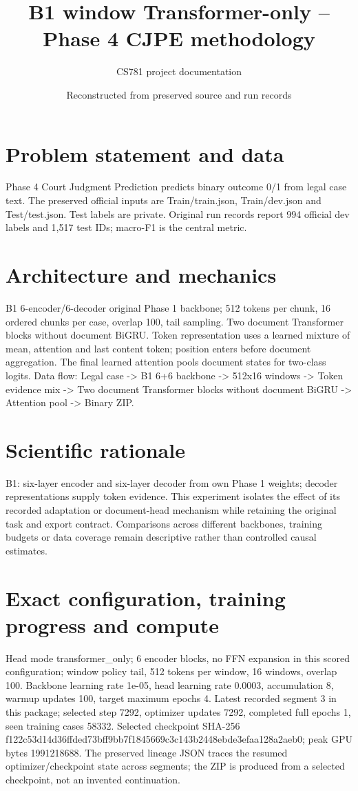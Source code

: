 \documentclass[11pt,a4paper]{article}
\begin{document}
\title{B1 window Transformer-only -- Phase 4 CJPE methodology}
\author{CS781 project documentation}
\date{Reconstructed from preserved source and run records}
\maketitle
\section{Problem statement and data}
Phase 4 Court Judgment Prediction predicts binary outcome 0/1 from legal case text. The preserved official inputs are Train/train.json, Train/dev.json and Test/test.json. Test labels are private. Original run records report 994 official dev labels and 1,517 test IDs; macro-F1 is the central metric.
\section{Architecture and mechanics}
B1 6-encoder/6-decoder original Phase 1 backbone; 512 tokens per chunk, 16 ordered chunks per case, overlap 100, tail sampling. Two document Transformer blocks without document BiGRU. Token representation uses a learned mixture of mean, attention and last content token; position enters before document aggregation. The final learned attention pools document states for two-class logits. Data flow: Legal case -> B1 6+6 backbone -> 512x16 windows -> Token evidence mix -> Two document Transformer blocks without document BiGRU -> Attention pool -> Binary ZIP.
\section{Scientific rationale}
B1: six-layer encoder and six-layer decoder from own Phase 1 weights; decoder representations supply token evidence. This experiment isolates the effect of its recorded adaptation or document-head mechanism while retaining the original task and export contract. Comparisons across different backbones, training budgets or data coverage remain descriptive rather than controlled causal estimates.
\section{Exact configuration, training progress and compute}
Head mode transformer\_only; 6 encoder blocks, no FFN expansion in this scored configuration; window policy tail, 512 tokens per window, 16 windows, overlap 100. Backbone learning rate 1e-05, head learning rate 0.0003, accumulation 8, warmup updates 100, target maximum epochs 4. Latest recorded segment 3 in this package; selected step 7292, optimizer updates 7292, completed full epochs 1, seen training cases 58332. Selected checkpoint SHA-256 f122c53d14d36ffded73bff9bb7f1845669c3c143b2448ebde3efaa128a2aeb0; peak GPU bytes 1991218688. The preserved lineage JSON traces the resumed optimizer/checkpoint state across segments; the ZIP is produced from a selected checkpoint, not an invented continuation.
\end{document}
